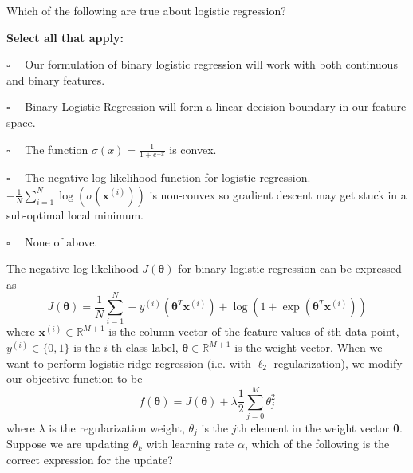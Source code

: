 \documentclass[11pt,addpoints,answers]{exam}
\newcommand{\emptysquare}{{\LARGE $\square$}\ \ }
\newcommand{\filledsquare}{{\LARGE $\boxtimes$}\ \ }
\newcommand{\xv}{\mathbf{x}}
\newcommand{\thetav     }{\boldsymbol \theta     }
\begin{document}
\begin{questions}
        \question[2] Which of the following are true about logistic regression?
    
    \textbf{Select all that apply:}
    \begin{list}{}
        \item 
            \emptysquare
            Our formulation of binary logistic regression will work with both continuous and binary features.
        \item 
            \emptysquare
            Binary Logistic Regression will form a linear decision boundary in our feature space.
        \item 
            \emptysquare
            The function $\sigma(x) = \frac{1}{1+e^{-x}}$ is convex.
        \item 
            \emptysquare
            The negative log likelihood function for logistic regression. $- \frac1N\sum_{i = 1}^N \log(\sigma(\xv^{(i)}))$ is non-convex so gradient descent may get stuck in a sub-optimal local minimum.
        \item 
            \emptysquare
            None of above.
    \end{list}
    
    
    
    \question[1] The negative log-likelihood $J(\thetav)$ for binary logistic regression can be expressed as 
    $$J(\thetav) = \frac{1}{N}\sum_{i=1}^N  -y^{(i)}\left(\thetav^T\xv^{\left(i\right)}\right)+\log\left(1+\exp(\thetav^T\xv^{\left(i\right)})\right)$$
    where $\xv^{(i)}\in \mathbb{R}^{M+1}$ is the column vector of the feature values of $i$th data point, $y^{(i)}\in\{0, 1\}$ is the $i$-th class label, $\thetav\in\mathbb{R}^{M+1}$ is the weight vector. When we want to perform logistic ridge regression (i.e. with $\ell_2$ regularization), we modify our objective function to be 
    $$ f(\thetav) = J(\thetav) + \lambda \frac{1}{2}\sum_{j=0}^M \theta_j^2$$
    where $\lambda$ is the regularization weight, $\theta_j$ is the $j$th element in the weight vector $\thetav$. Suppose we are updating $\theta_k$ with learning rate $\alpha$, which of the following is the correct expression for the update?
    

\end{questions}
\end{document}
